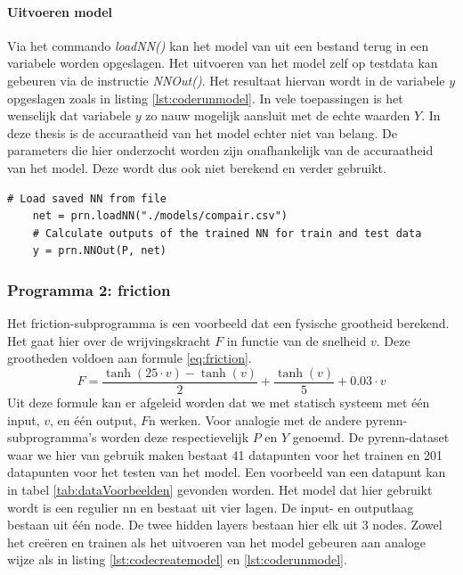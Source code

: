 			\paragraph{Uitvoeren model} 
			Via het commando \textit{loadNN()} kan het model van uit een bestand terug in een variabele worden opgeslagen. Het uitvoeren van het model zelf op testdata kan gebeuren via de instructie \textit{NNOut()}. Het resultaat hiervan wordt in de variabele $y$ opgeslagen zoals in listing \ref{lst:coderunmodel}. In vele toepassingen is het wenselijk dat variabele $y$ zo nauw mogelijk aansluit met de echte waarden $Y$. In deze thesis is de accuraatheid van het model echter niet van belang. De parameters die hier onderzocht worden zijn onafhankelijk van de accuraatheid van het model. Deze wordt dus ook niet berekend en verder gebruikt. 
	\begin{lstlisting}[caption={uitvoeren van pyrenn-model.},captionpos=b, label = {lst:coderunmodel}]
	# Load saved NN from file
	net = prn.loadNN("./models/compair.csv")
	# Calculate outputs of the trained NN for train and test data	
	y = prn.NNOut(P, net)
	\end{lstlisting}
		
		\subsubsection{Programma 2: friction}
		Het friction-subprogramma is een voorbeeld dat een fysische grootheid berekend. Het gaat hier over de wrijvingskracht $F$ in functie van de snelheid $v$. Deze grootheden voldoen aan formule \ref{eq:friction}. 
		\begin{equation}\label{eq:friction}
					F = \frac{\tanh(25 \cdot v)- \tanh(v)}{2} + \frac{\tanh(v)}{5}+0.03\cdot v			
		\end{equation}
		Uit deze formule kan er afgeleid worden dat we met statisch systeem met \'e\'en input, $v$, en \'e\'en output, $F$n werken. Voor analogie met de andere pyrenn-subprogramma's worden deze respectievelijk $P$ en $Y$ genoemd. De pyrenn-dataset waar we hier van gebruik maken bestaat 41 datapunten voor het trainen en 201 datapunten voor het testen van het model. Een voorbeeld van een datapunt kan in tabel \ref{tab:dataVoorbeelden} gevonden worden. Het model dat hier gebruikt wordt is een regulier \gls{nn} en bestaat uit vier lagen. De input- en outputlaag bestaan uit \'e\'en node. De twee hidden layers bestaan hier elk uit 3 nodes. Zowel het cre\"eren en trainen als het uitvoeren van het model gebeuren aan analoge wijze als in listing \ref{lst:codecreatemodel} en \ref{lst:coderunmodel}.
						
